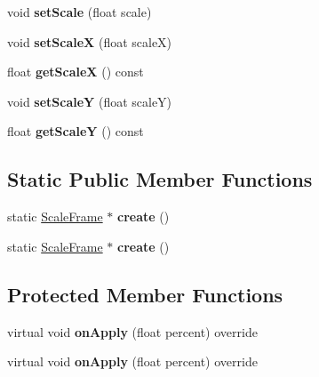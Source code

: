 \begin{DoxyCompactItemize}
void {\bfseries set\+Scale} (float scale)
\item 
\mbox{\label{classScaleFrame_a103be1c0e5367efeef09d2c4d0b4b7ed}} 
void {\bfseries set\+ScaleX} (float scaleX)
\item 
\mbox{\label{classScaleFrame_a8cced6ff4cc53c05f483d14aa464b6ed}} 
float {\bfseries get\+ScaleX} () const
\item 
\mbox{\label{classScaleFrame_ac85bfc171c453388261b6bd994ad1e97}} 
void {\bfseries set\+ScaleY} (float scaleY)
\item 
\mbox{\label{classScaleFrame_a713f4226711b0ba167c9bde2038977e5}} 
float {\bfseries get\+ScaleY} () const
\end{DoxyCompactItemize}
\subsection*{Static Public Member Functions}
\begin{DoxyCompactItemize}
\item 
\mbox{\label{classScaleFrame_a8dc012766d52dd18fbe0b7761a6509f9}} 
static \hyperlink{classScaleFrame}{Scale\+Frame} $\ast$ {\bfseries create} ()
\item 
\mbox{\label{classScaleFrame_a9bd0f15019b92508152dc79924920443}} 
static \hyperlink{classScaleFrame}{Scale\+Frame} $\ast$ {\bfseries create} ()
\end{DoxyCompactItemize}
\subsection*{Protected Member Functions}
\begin{DoxyCompactItemize}
\item 
\mbox{\label{classScaleFrame_a053c2e7cbcd24f431738cc10d8b7b9b8}} 
virtual void {\bfseries on\+Apply} (float percent) override
\item 
\mbox{\label{classScaleFrame_ae702f620fb38d53e8c6215394dd42d8a}} 
virtual void {\bfseries on\+Apply} (float percent) override
\end{DoxyCompactItemize}
